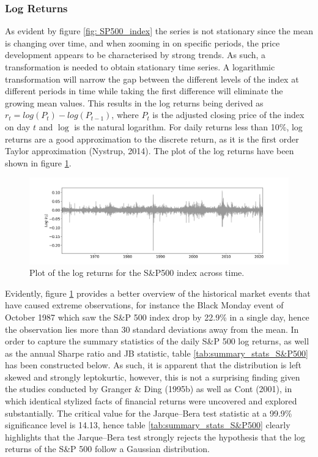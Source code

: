 \subsubsection{Log Returns}
As evident by figure \ref{fig: SP500_index} the series is not stationary since the mean is changing over time, and when zooming in on specific periods, the price development appears to be characterised by strong trends. As such, a transformation is needed to obtain stationary time series. A logarithmic transformation will narrow the gap between the different levels of the index at different periods in time while taking the first difference will eliminate the growing mean values. This results in the log returns being derived as $r_t = log(P_t) - log(P_{t-1})$, where $P_t$ is the adjusted closing price of the index on day $t$ and $\log$ is the natural logarithm. For daily returns less than 10\%, log returns are a good approximation to the discrete return, as it is the first order Taylor approximation (Nystrup, 2014). The plot of the log returns have been shown in figure \ref{fig: log_returns_all_indices}. 

\begin{figure}[H] 
    \centering
    \includegraphics[width=1\textwidth]{analysis/data_description/images/SP500_log_returns.png}
    \caption [Plot of the log returns for the S\&P500 index across time] {Plot of the log returns for the S\&P500 index across time.}
    \label{fig: log_returns_all_indices}
\end{figure}


Evidently, figure \ref{fig: log_returns_all_indices} provides a better overview of the historical market events that have caused extreme observations, for instance the Black Monday event of October 1987 which saw the S\&P 500 index drop by 22.9\% in a single day, hence the observation lies more than 30 standard deviations away from the mean. In order to capture the summary statistics of the daily S\&P 500 log returns, as well as the annual Sharpe ratio and JB statistic, table \ref{tab:summary_stats_S&P500} has been constructed below. As such, it is apparent that the distribution is left skewed and strongly leptokurtic, however, this is not a surprising finding given the studies conducted by Granger \& Ding (1995b) as well as Cont (2001), in which identical stylized facts of financial returns were uncovered and explored substantially. The critical value for the Jarque–Bera test statistic at a 99.9\% significance level is 14.13, hence table \ref{tab:summary_stats_S&P500} clearly highlights that the Jarque–Bera test strongly rejects the hypothesis that the log returns of the S\&P 500 follow a Gaussian distribution.

